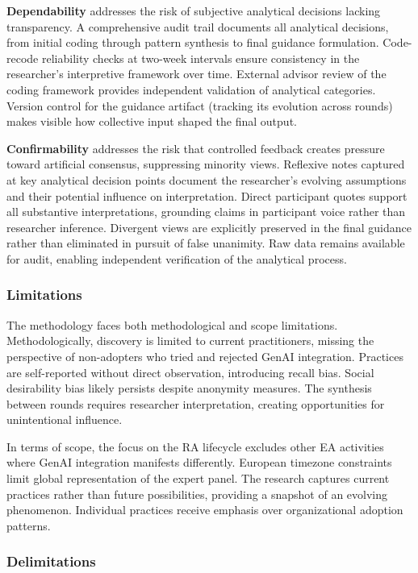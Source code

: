 \textbf{Dependability} addresses the risk of subjective analytical decisions
lacking transparency. A comprehensive audit trail documents all analytical
decisions, from initial coding through pattern synthesis to final guidance
formulation. Code-recode reliability checks at two-week intervals ensure
consistency in the researcher's interpretive framework over time. External
advisor review of the coding framework provides independent validation of
analytical categories. Version control for the guidance artifact (tracking its
evolution across rounds) makes visible how collective input shaped the
final output.

\textbf{Confirmability} addresses the risk that controlled feedback creates
pressure toward artificial consensus, suppressing minority views. Reflexive notes captured at key analytical decision points document the
researcher's evolving assumptions and their potential influence on
interpretation. Direct
participant quotes support all substantive interpretations, grounding claims in
participant voice rather than researcher inference. Divergent views are
explicitly preserved in the final guidance rather than eliminated in pursuit of
false unanimity. Raw data remains available for audit, enabling independent
verification of the analytical process.

\subsubsection{Limitations}

The methodology faces both methodological and scope limitations.
Methodologically, discovery is limited to current practitioners, missing the
perspective of non-adopters who tried and rejected GenAI integration.
Practices are self-reported without direct observation, introducing recall
bias. Social desirability bias likely persists despite anonymity measures.
The synthesis between rounds requires researcher interpretation, creating
opportunities for unintentional influence.

In terms of scope, the focus on the RA lifecycle excludes other EA activities
where GenAI integration manifests differently. European timezone constraints
limit global representation of the expert panel. The research captures current
practices rather than future possibilities, providing a snapshot of an evolving
phenomenon. Individual practices receive emphasis over organizational adoption
patterns.

\subsubsection{Delimitations}

